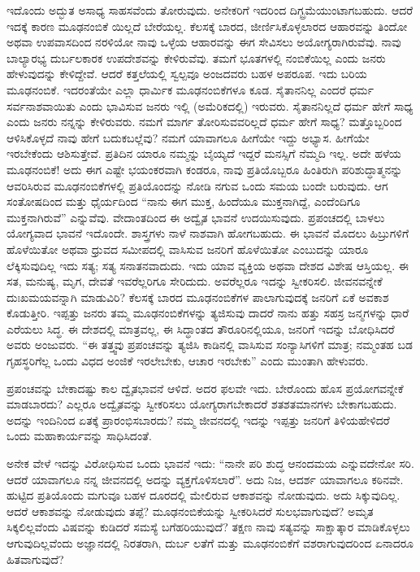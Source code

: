ಇದೊಂದು ಅದ್ಭುತ ಅಸಾಧ್ಯ ಸಾಹಸವೆಂದು ತೋರುವುದು. ಅನೇಕರಿಗೆ ಇದರಿಂದ ದಿಗ್ಬ್ರಮೆಯುಂಟಾಗಬಹುದು. ಆದರೆ ಇದಕ್ಕೆ ಕಾರಣ ಮೂಢನಂಬಿಕೆ ಯಿಲ್ಲದೆ ಬೇರೆಯಲ್ಲ. ಕೆಲಸಕ್ಕೆ ಬಾರದ, ಜೀರ್ಣಿಸಿಕೊಳ್ಳಲಾರದ ಆಹಾರವನ್ನು ತಿಂದೋ ಅಥವಾ ಉಪವಾಸದಿಂದ ನರಳಿಯೋ ನಾವು ಒಳ್ಳೆಯ ಆಹಾರವನ್ನು ಈಗ ಸೇವಿಸಲು ಅಯೋಗ್ಯರಾಗಿರುವೆವು. ನಾವು ಬಾಲ್ಯಾರಭ್ಯ ದುರ್ಬಲಕಾರಕ ಉಪದೇಶವನ್ನು ಕೇಳಿರುವೆವು. ತಮಗೆ ಭೂತಗಳಲ್ಲಿ ನಂಬಿಕೆಯಿಲ್ಲ ಎಂದು ಜನರು ಹೇಳುವುದನ್ನು ಕೇಳಿದ್ದೇವೆ. ಆದರೆ ಕತ್ತಲೆಯಲ್ಲಿ ಸ್ವಲ್ಪವೂ ಅಂಜದವರು ಬಹಳ ಅಪರೂಪ. ಇದು ಬರಿಯ ಮೂಢನಂಬಿಕೆ. ಇದರಂತೆಯೇ ಎಲ್ಲಾ ಧಾರ್ಮಿಕ ಮೂಢನಂಬಿಕೆಗಳೂ ಕೂಡ. ಸೈತಾನನಿಲ್ಲ ಎಂದರೆ ಧರ್ಮ ಸರ್ವನಾಶವಾಯಿತು ಎಂದು ಭಾವಿಸುವ ಜನರು ಇಲ್ಲಿ (ಅಮೆರಿಕದಲ್ಲಿ) ಇರುವರು. ಸೈತಾನನಿಲ್ಲದೆ ಧರ್ಮ ಹೇಗೆ ಸಾಧ್ಯ ಎಂದು ಜನರು ನನ್ನನ್ನು ಕೇಳಿರುವರು. ನಮಗೆ ಮಾರ್ಗ ತೋರಿಸುವವರಿಲ್ಲದೆ ಧರ್ಮ ಹೇಗೆ ಸಾಧ್ಯ? ಮತ್ತೊಬ್ಬರಿಂದ ಆಳಿಸಿಕೊಳ್ಳದೆ ನಾವು ಹೇಗೆ ಬದುಕಬಲ್ಲೆವು? ನಮಗೆ ಯಾವಾಗಲೂ ಹೀಗೆಯೇ ಇದ್ದು ಅಭ್ಯಾಸ. ಹೀಗೆಯೇ ಇರಬೇಕೆಂದು ಆಶಿಸುತ್ತೇವೆ. ಪ್ರತಿದಿನ ಯಾರೂ ನಮ್ಮನ್ನು ಬೈಯ್ಯದೆ ಇದ್ದರೆ ಮನಸ್ಸಿಗೆ ನೆಮ್ಮದಿ ಇಲ್ಲ. ಅದೇ ಹಳೆಯ ಮೂಢನಂಬಿಕೆ! ಅದು ಈಗ ಎಷ್ಟೇ ಭಯಂಕರವಾಗಿ ಕಂಡರೂ, ನಾವು ಪ್ರತಿಯೊಬ್ಬರೂ ಹಿಂತಿರುಗಿ ಪರಿಶುದ್ಧಾತ್ಮನನ್ನು ಆವರಿಸಿರುವ ಮೂಢನಂಬಿಕೆಗಳಲ್ಲಿ ಪ್ರತಿಯೊಂದನ್ನು ನೋಡಿ ನಗುವ ಒಂದು ಸಮಯ ಬಂದೇ ಬರುವುದು. ಆಗ ಸಂತೋಷದಿಂದ ಮತ್ತು ಧೈರ್ಯದಿಂದ “ನಾನು ಈಗ ಮುಕ್ತ, ಹಿಂದೆಯೂ ಮುಕ್ತನಾಗಿದ್ದೆ, ಎಂದೆಂದಿಗೂ ಮುಕ್ತನಾಗಿರುವೆ” ಎನ್ನುವೆವು. ವೇದಾಂತದಿಂದ ಈ ಅದ್ವೈತ ಭಾವನೆ ಉದಯಿಸುವುದು. ಪ್ರಪಂಚದಲ್ಲಿ ಬಾಳಲು ಯೋಗ್ಯವಾದ ಭಾವನೆ ಇದೊಂದೇ. ಶಾಸ್ತ್ರಗಳು ನಾಳೆ ನಾಶವಾಗಿ ಹೋಗಬಹುದು. ಈ ಭಾವನೆ ಮೊದಲು ಹಿಬ್ರುಗಳಿಗೆ ಹೊಳೆಯಿತೋ ಅಥವಾ ಧ್ರುವದ ಸಮೀಪದಲ್ಲಿ ವಾಸಿಸುವ ಜನರಿಗೆ ಹೊಳೆಯಿತೋ ಎಂಬುದನ್ನು ಯಾರೂ ಲೆಕ್ಕಿಸುವುದಿಲ್ಲ ಇದು ಸತ್ಯ; ಸತ್ಯ ಸನಾತನವಾದುದು. ಇದು ಯಾವ ವ್ಯಕ್ತಿಯ ಅಥವಾ ದೇಶದ ವಿಶೇಷ ಆಸ್ತಿಯಲ್ಲ. ಈ ಸತ, ಮನುಷ್ಯ, ಮೃಗ, ದೇವತೆ ಇವರೆಲ್ಲರಿಗೂ ಸೇರಿದುದು. ಅವರೆಲ್ಲರೂ ಇದನ್ನು ಸ್ವೀಕರಿಸಲಿ. ಜೀವನವನ್ನೇಕೆ ದುಃಖಮಯವನ್ನಾಗಿ ಮಾಡುವಿರಿ? ಕೆಲಸಕ್ಕೆ ಬಾರದ ಮೂಢನಂಬಿಕೆಗಳ ಪಾಲಾಗುವುದಕ್ಕೆ ಜನರಿಗೆ ಏಕೆ ಅವಕಾಶ ಕೊಡುತ್ತೀರಿ. ಇಪ್ಪತ್ತು ಜನರು ತಮ್ಮ ಮೂಢನಂಬಿಕೆಗಳನ್ನು ತ್ಯಜಿಸುವು ದಾದರೆ ನಾನು ಹತ್ತು ಸಹಸ್ರ ಜನ್ಮಗಳನ್ನು ಧಾರೆ ಎರೆಯಲು ಸಿದ್ಧ. ಈ ದೇಶದಲ್ಲಿ ಮಾತ್ರವಲ್ಲ, ಈ ಸಿದ್ಧಾಂತದ ತೌರೂರಿನಲ್ಲಿಯೂ, ಜನರಿಗೆ ಇದನ್ನು ಬೋಧಿಸಿದರೆ ಅವರು ಅಂಜುವರು. “ಈ ತತ್ತ್ವವು ಪ್ರಪಂಚವನ್ನು ತ್ಯಜಿಸಿ ಕಾಡಿನಲ್ಲಿ ವಾಸಿಸುವ ಸಂನ್ಯಾಸಿಗಳಿಗೆ ಮಾತ್ರ; ನಮ್ಮಂತಹ ಬಡ ಗೃಹಸ್ಥರಿಗೆಲ್ಲ ಒಂದು ವಿಧದ ಅಂಜಿಕೆ ಇರಲೇಬೇಕು, ಆಚಾರ ಇರಬೇಕು” ಎಂದು ಮುಂತಾಗಿ ಹೇಳುವರು.

ಪ್ರಪಂಚವನ್ನು ಬೇಕಾದಷ್ಟು ಕಾಲ ದ್ವೈತಭಾವನೆ ಆಳಿದೆ. ಅದರ ಫಲವೇ ಇದು. ಬೇರೊಂದು ಹೊಸ ಪ್ರಯೋಗವನ್ನೇಕೆ ಮಾಡಬಾರದು? ಎಲ್ಲರೂ ಅದ್ವೈತವನ್ನು ಸ್ವೀಕರಿಸಲು ಯೋಗ್ಯರಾಗಬೇಕಾದರೆ ಶತಶತಮಾನಗಳು ಬೇಕಾಗಬಹುದು. ಅದನ್ನು ಇಂದಿನಿಂದ ಏತಕ್ಕೆ ಪ್ರಾರಂಭಿಸಬಾರದು? ನಮ್ಮ ಜೀವನದಲ್ಲಿ ಇದನ್ನು ಇಪ್ಪತ್ತು ಜನರಿಗೆ ತಿಳಿಯಹೇಳಿದರೆ ಒಂದು ಮಹಾಕಾರ್ಯವನ್ನು ಸಾಧಿಸಿದಂತೆ.

ಅನೇಕ ವೇಳೆ ಇದನ್ನು ವಿರೋಧಿಸುವ ಒಂದು ಭಾವನೆ ಇದು: “ನಾನೇ ಪರಿ ಶುದ್ಧ ಆನಂದಮಯ ಎನ್ನುವದೇನೋ ಸರಿ. ಆದರೆ ಯಾವಾಗಲೂ ನನ್ನ ಜೀವನದಲ್ಲಿ ಅದನ್ನು ವ್ಯಕ್ತಗೊಳಿಸಲಾರೆ”. ಅದು ನಿಜ, ಆದರ್ಶ ಯಾವಾಗಲೂ ಕಠಿನವೇ. ಹುಟ್ಟಿದ ಪ್ರತಿಯೊಂದು ಮಗುವೂ ಬಹಳ ದೂರದಲ್ಲಿ ಮೇಲಿರುವ ಆಕಾಶವನ್ನು ನೋಡುವುದು. ಅದು ಸಿಕ್ಕುವುದಿಲ್ಲ. ಆದರೆ ಆಕಾಶವನ್ನು ನೋಡುವುದು ತಪ್ಪೆ? ಮೂಢನಂಬಿಕೆಯನ್ನು ಸ್ವೀಕರಿಸಿದರೆ ಸುಲಭವಾಗುವುದೆ? ಅಮೃತ ಸಿಕ್ಕಲಿಲ್ಲವೆಂದು ವಿಷವನ್ನು ಕುಡಿದರೆ ಸಮಸ್ಯೆ ಬಗೆಹರಿಯುವುದೆ? ತಕ್ಷಣ ನಾವು ಸತ್ಯವನ್ನು ಸಾಕ್ಷಾತ್ಕಾರ ಮಾಡಿಕೊಳ್ಳಲು ಆಗುವುದಿಲ್ಲವೆಂದು ಅಜ್ಞಾನದಲ್ಲಿ ನಿರತರಾಗಿ, ದುರ್ಬ ಲತೆಗೆ ಮತ್ತು ಮೂಢನಂಬಿಕೆಗೆ ವಶರಾಗುವುದರಿಂದ ಏನಾದರೂ ಹಿತವಾಗುವುದೆ?

